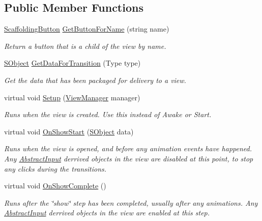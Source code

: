 \subsection*{Public Member Functions}
\begin{DoxyCompactItemize}
\item 
\hyperlink{class_scaffolding_1_1_scaffolding_button}{Scaffolding\-Button} \hyperlink{class_scaffolding_1_1_abstract_view_a0d1b13f8a8b94985aecef73344b33270}{Get\-Button\-For\-Name} (string name)
\begin{DoxyCompactList}\small\item\em Return a button that is a child of the view by name. \end{DoxyCompactList}\item 
\hyperlink{class_scaffolding_1_1_s_object}{S\-Object} \hyperlink{class_scaffolding_1_1_abstract_view_a3acb31a04d6fa8d91358cb289cf12f28}{Get\-Data\-For\-Transition} (Type type)
\begin{DoxyCompactList}\small\item\em Get the data that has been packaged for delivery to a view. \end{DoxyCompactList}\item 
virtual void \hyperlink{class_scaffolding_1_1_abstract_view_adf0ec646b670c17b7635f21a74432332}{Setup} (\hyperlink{class_scaffolding_1_1_view_manager}{View\-Manager} manager)
\begin{DoxyCompactList}\small\item\em Runs when the view is created. Use this instead of Awake or Start. \end{DoxyCompactList}\item 
virtual void \hyperlink{class_scaffolding_1_1_abstract_view_a7c4ad4fbf3039a5acc67a16e6672510e}{On\-Show\-Start} (\hyperlink{class_scaffolding_1_1_s_object}{S\-Object} data)
\begin{DoxyCompactList}\small\item\em Runs when the view is opened, and before any animation events have happened. Any \hyperlink{class_scaffolding_1_1_abstract_input}{Abstract\-Input} derrived objects in the view are disabled at this point, to stop any clicks during the transitions. \end{DoxyCompactList}\item 
virtual void \hyperlink{class_scaffolding_1_1_abstract_view_ad3d0ee8b69a70afa3355c9aad0ab34b6}{On\-Show\-Complete} ()
\begin{DoxyCompactList}\small\item\em Runs after the \char`\"{}show\char`\"{} step has been completed, usually after any animations. Any \hyperlink{class_scaffolding_1_1_abstract_input}{Abstract\-Input} derrived objects in the view are enabled at this step. \end{DoxyCompactList}\item 

\end{DoxyCompactItemize}
